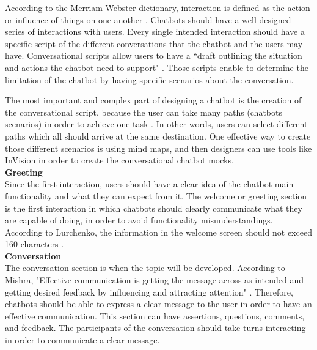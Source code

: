 \documentclass[a4paper,10pt]{article}
\begin{document}
According to the Merriam-Webster dictionary, interaction is defined as the action or influence of things on one another \cite{merriam-webster}.
Chatbots should have a well-designed series of interactions with users. Every single intended interaction should have a specific script of the different conversations that the chatbot and the users may have. Conversational scripts allow users to have a ``draft outlining the situation and actions the chatbot need to support" \cite{CaseStudy}. Those scripts enable to determine the limitation of the chatbot by having specific scenarios about the conversation. 

The most important and complex part of designing a chatbot is the creation of the conversational script, because the user can take many paths (chatbots scenarios) in order to achieve one task \cite{designChatbotConversatio}. In other words, users can select different paths which all should arrive at the same destination. One effective way to create those different scenarios is using mind maps, and then designers can use tools like InVision in order to create the conversational chatbot mocks.    \\[0\baselineskip]

\textbf{Greeting}\\[0\baselineskip]
Since the first interaction, users should have a clear idea of the chatbot main functionality and what they can expect from it.
The welcome or greeting section is the first interaction in which chatbots should clearly communicate what they are capable of doing, in order to avoid functionality misunderstandings. According to Lurchenko, the information in the welcome screen should not exceed 160 characters \cite{CheatSheet}. \\[0\baselineskip]

\textbf{Conversation}\\[0\baselineskip]
The conversation section is when the topic will be developed. According to Mishra, "Effective communication is getting the message across as intended and getting desired feedback by influencing and attracting attention" \cite{effectivCommunication}. Therefore, chatbots should be able to express a clear message to the user in order to have an effective communication. This section can have assertions, questions, comments, and feedback. The participants of the conversation should take turns interacting in order to communicate a clear message. \\[0\baselineskip]
\end{document}
